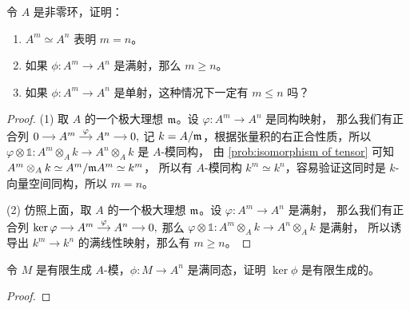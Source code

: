 \begin{problem}
  令 $A$ 是非零环，证明：
  \begin{enumerate}
    \item $A^m\simeq A^n$ 表明 $m=n$。
    \item 如果 $\phi:A^m\to A^n$ 是满射，那么 $m\geq n$。
    \item 如果 $\phi:A^m\to A^n$ 是单射，这种情况下一定有 $m\leq n$ 吗？
  \end{enumerate}
\end{problem}
\begin{proof}
  (1) 取 $A$ 的一个极大理想 $\mathfrak{m}$。设 $\varphi:A^m\to A^n$ 是同构映射，
  那么我们有正合列 
  $
    \begin{tikzcd}[cramped,column sep=small]
      0\arrow[r] & A^m\arrow[r,"\varphi"] & A^n\arrow[r] & 0
    \end{tikzcd},
  $
  记 $k=A/\mathfrak{m}$，根据张量积的右正合性质，所以
  $\varphi\otimes\mathbb{1}:A^m\otimes_Ak\to A^n\otimes_Ak$ 是 $A$-模同构，
  由 \autoref{prob:isomorphism of tensor} 可知 $A^m\otimes_Ak\simeq A^m/\mathfrak{m}A^m\simeq k^m$，
  所以有 $A$-模同构 $k^m\simeq k^n$，容易验证这同时是 $k$-向量空间同构，所以 $m=n$。

  (2) 仿照上面，取 $A$ 的一个极大理想 $\mathfrak{m}$。设 $\varphi:A^m\to A^n$ 是满射，
  那么我们有正合列 
  $
    \begin{tikzcd}[cramped,column sep=small]
      \ker\varphi \arrow[r] & A^m\arrow[r,"\varphi"] & A^n\arrow[r] & 0
    \end{tikzcd},
  $
  那么 $\varphi\otimes \mathbb{1}:A^m\otimes_Ak\to A^n\otimes_Ak$ 是满射，
  所以诱导出 $k^m\to k^n$ 的满线性映射，那么有 $m\geq n$。
\end{proof}

\begin{problem}
  令 $M$ 是有限生成 $A$-模，$\phi:M\to A^n$ 是满同态，证明 $\ker\phi$ 是有限生成的。
\end{problem}
\begin{proof}
  
\end{proof}


